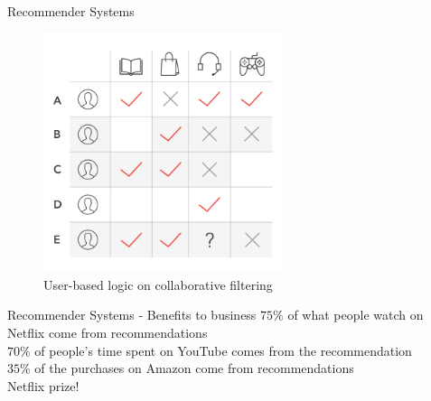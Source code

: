 \begin{frame}{Recommender Systems}
    \begin{figure}
       \centering
       \includegraphics[width=7cm]{fig/ch2-colab-filt-user-user.jpg}
       \caption{User-based logic on collaborative filtering}
    \end{figure}
\end{frame}


\begin{frame}{Recommender Systems - Benefits to business} \pause
    $75\%$ of what people watch on Netflix come from recommendations \\ \pause
    \vspace{0.5cm}
    $70\%$ of people's time spent on YouTube comes from the recommendation \\ \pause
    \vspace{0.5cm}
    $35\%$ of the purchases on Amazon come from recommendations \\ \pause
    \vspace{0.5cm}
    Netflix prize!
\end{frame}


